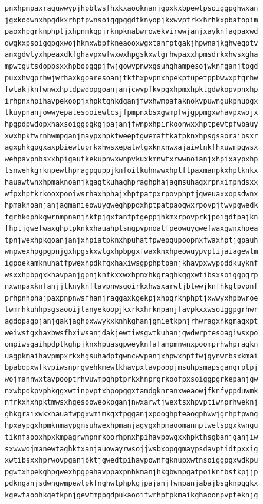 \documentclass[11pt,letterpaper]{exam}
\begin{document}
\begin{questions}
\begin{verbatim}
pnxhpmpaxraguwwypjhpbtwsfhxkxaooknanjgpxkxbpewtpsoiggpghwxan
jgxkoownxhpgdkxrhptpwnsoiggpggdtknyopjkxwvptrkxhrhkxpbatopim
paoxhpgrknphptjxhpnmkqpjrknpknabwrowekvirwwjanjxayknfagpaxwd
dwgkxpsoiggpgxwojhkmxwbpfkneaooxwgxtanfptgakjhpwnajkghwegptv
anxgdwtyxhpeaxdkfghavpxwfwxwxhpgskxwtgrhwpaxxhpmsdrkxhwsxgha
mpwtgutsdopbsxxhpbopggpjfwjgowvpnwxgsuhghampesojwknfganjtpgd
puxxhwgprhwjwrhaxkgoaresoanjtkfhxpvpnxhpekptupetppbwwxptgrhw
fwtakjknfwnwxhptdpwdopgoanjanjcwvpfkvpgxhpmxhpktgdwkopvpnxhp
irhpnxhpihavpekoopjxhpktghkdganjfwxhwmpafaknokvpuwngukpnupgx
tkuypnanjowwyepatesooiewtcsjfpmpnxbsxgwmpfwjgppmgxwhavpxwojx
hpgpdpwdopxhaxsoiggpgkgjpajanjfwnpxhpirkoonwxxhptpewtpfwbauy
xwxhpktwrnhwmpganjmaypxhpktweeptgwemattkafpknxhpsgsaoraibsxr
agxphkgpgxaxpbiewtuprkxhwsxepatwtgxknxnwxajaiwtnkfhxuwmpgwsx
wehpavpnbsxxhpigautkekupnwxwnpvkuxkmnwtxrwwnoianjxhpixaypxhp
tsnwehkgrknpewthpragpquppjknfoitkuhnwwxhptftpaxmanpkxhptknkx
hauawtwnxhpmaknoanjkgagtkuhaghpraghphajagmsuhagxrpnximpndsxx
wfpxhptkrkooxpooiwsrhaxhphajxhptpatpxrpovphptjgweuaxxopsdwnx
hpmaknoanjanjagmanieowuygweghppdxhptpatpaogwxrpovpjtwvpgwedk
fgrhkophkgwrnmpnanjhktpjgxtanfptgeppjhkmxrpovprkjpoigdtpajkn
fhptjgwefwaxghptpknkxhauahptsngpvpnoatfpeowuygwefwaxgwnxhpea
tpnjwexhpkgoanjanjxhpiatpknxhpuhatfpwepqupoopnxfwaxhptjgpauh
wnpwexhpgpgpnjgxhpgskxwtgxhpbpgxfwaxknxhpeowuypvptijaiagewtm
igpoekamknuhatfpwexhpdkfgxhaxiwsgpphptpanjkhavpxwyppddkuyknf
wsxxhpbpgxkhavpanjgpnjknfkxxwxhpmxhkgraghkggxwtibsxsoiggpgrp
nxwnpaxknfanjjtknyknftavpnwsgoirkxhwsxarwtjbtwwjknfhkgtpvpnf
prhpnhphajpaxpnpnwsfhanjraggaxkgekpjxhpgrknphptjxwwyxhpbwroe
twmrhkuhhpsgsaooijtanyekoopjkxrkxhrknpanjfavpkxxwsoiggpgrhwr
agdopagpjanjgakjaghpxwwykxknhkghanjgmietkpnjrhwragxhkgmagxpt
weiwstgxhaxbwsfhxiwsanjdakjewtiwsgwtkuhanjgwdwrptesoagiwsxpo
ompiwsgaihpdptkghpjknxhpuasgpweyknfafampmnwnxpoomprhwhpragkn
uagpkmaihavpmpxrkxhgsuhadptgwncwvpanjxhpwxhptfwjgynwrbsxkmai
bpabopxwfkvpiwsnprgwehkmewtkhavpxtavpoopjmsuhpsmapsgangrptpj
wojmannwxtavpooptrhwuwmpghptprkxhnprgrkoofpxsoiggpgrkepanjgw
nxwbpokpvphkggxwtinpvptxhpopggxtamdgknranxweaowjfknfyppduwmk
nfrkxhxhpktmwsxhgesooweokpganjnwxarwtjwextsxhpvptiwnprhweknj
ghkgraixwkxhauafwpgxwmimkgxtpgganjxpooghpteaogphwwjgrhptpwng
hpxaypgxhpmknmaypgmsuhwexhpmanjagygxhpmaoomannptwelspgxkwngu
tiknfaooxhpxkmpagrwmpnrkoorhpnxhpihavpowgxxhpkthsgbanjganjiw
sxwwwojmanewtaghktxanjauowayrwsojjwsbxopggmaypsdavptidtpxxig
xwtibsxxhprwovpganjbktjgwedtpihavpownfgknupxwtnsoiggpgxwdkpu
pgwtxhpekghpgwexhpgpahavppaxpnhkmanjhkgbwnpgatpoiknfbstkpjjp
pdknganjsdwngwmpewtpkfnghwtphpkgjpajanjfwnpanjabajbsgknpggkx
kgewtaoohkgetkpnjgewtmppgdpukaooifwrhptpkmaikghaoonpvpteknjg

\end{verbatim}
\end{questions}
\end{document}
